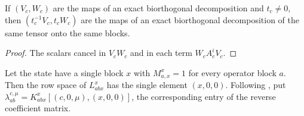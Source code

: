 \begin{lemma}
    \leanok
    \label{lem:glm_mixed_gauge_scalar}
    If $(V_c,W_c)$ are the maps of an exact biorthogonal decomposition and
    $t_c\neq0$, then $(t_c^{-1}V_c,t_cW_c)$ are the maps of an exact
    biorthogonal decomposition of the same tensor onto the same blocks.
\end{lemma}
\begin{proof}
    \leanok
    The scalars cancel in $V_cW_c$ and in each term $W_cA_c^iV_c$.
\end{proof}

\begin{definition}
    \leanok
    \label{def:glm_single_block_lambda}
    Let the state have a single block $x$ with $M_{a,x}^x=1$ for every
    operator block $a$. Then the row space of $L_{abx}^x$ has the single
    element $(x,0,0)$. Following \cite[Section~3.2]{GarreRubio2023MPOSym},
    put $\lambda_{ab}^{c,\mu}=K_{abx}^{x}[(c,0,\mu),(x,0,0)]$, the
    corresponding entry of the reverse coefficient matrix.
\end{definition}

